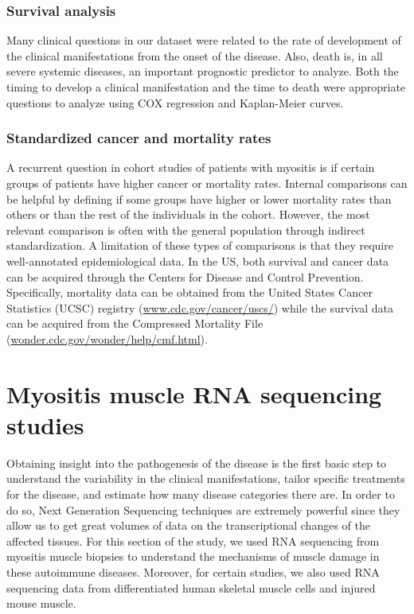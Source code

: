 \subsubsection{Survival analysis}
Many clinical questions in our dataset were related to the rate of development of the clinical manifestations from the onset of the disease. Also, death is, in all severe systemic diseases, an important prognostic predictor to analyze. Both the timing to develop a clinical manifestation and the time to death were appropriate questions to analyze using COX regression and Kaplan-Meier curves.

\subsubsection{Standardized cancer and mortality rates}
A recurrent question in cohort studies of patients with myositis is if certain groups of patients have higher cancer or mortality rates. Internal comparisons can be helpful by defining if some groups have higher or lower mortality rates than others or than the rest of the individuals in the cohort. However, the most relevant comparison is often with the general population through indirect standardization. A limitation of these types of comparisons is that they require well-annotated epidemiological data. In the US, both survival and cancer data can be acquired through the Centers for Disease and Control Prevention. Specifically, mortality data can be obtained from the United States Cancer Statistics (UCSC) registry (\url{www.cdc.gov/cancer/uscs/}) while the survival data can be acquired from the Compressed Mortality File (\url{wonder.cdc.gov/wonder/help/cmf.html}).

\section{Myositis muscle RNA sequencing studies}
Obtaining insight into the pathogenesis of the disease is the first basic step to understand the variability in the clinical manifestations, tailor specific treatments for the disease, and estimate how many disease categories there are. In order to do so, Next Generation Sequencing techniques are extremely powerful since they allow us to get great volumes of data on the transcriptional changes of the affected tissues. For this section of the study, we used RNA sequencing from myositis muscle biopsies to understand the mechanisms of muscle damage in these autoimmune diseases. Moreover, for certain studies, we also used RNA sequencing data from differentiated human skeletal muscle cells and injured mouse muscle.


